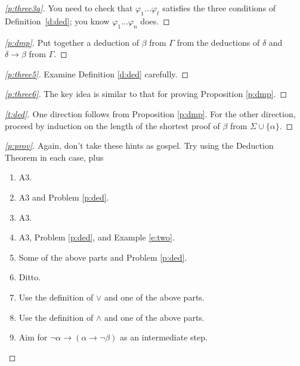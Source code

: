 \documentclass[12pt]{amsbook}
\theoremstyle{plain}
\theoremstyle{definition}
\theoremstyle{remark}
\newenvironment{clue}[1]%
{\begin{proof}[\ref{#1}]}%
{\renewcommand{\qed}{}\end{proof}}
\begin{document}
\begin{clue}{p:three3a}
You need to check that $\varphi_1 \dots \varphi_\ell$ satisfies the three conditions of Definition~\ref{d:ded};  you know $\varphi_1 \dots \varphi_n$ does.
\end{clue}

\begin{clue}{p:dmp}
Put together a deduction of $\beta$ from $\Gamma$ from the deductions of $\delta$ and $\delta \to \beta$ from $\Gamma$.
\end{clue}

\begin{clue}{p:three5}
Examine Definition \ref{d:ded} carefully.
\end{clue}

\begin{clue}{p:three6}
The key idea is similar to that for proving Proposition \ref{p:dmp}.
\end{clue}

\begin{clue}{t:ded}
One direction follows from Proposition \ref{p:dmp}.  For the other direction,  proceed by induction on the length of the shortest proof of $\beta$ from $\Sigma \cup \{ \alpha \}$.
\end{clue}

\begin{clue}{p:prov}
Again,  don't take these hints as gospel.  Try using the Deduction Theorem in each case,  plus
\begin{enumerate}
\item A3.
\item A3 and Problem \ref{p:ded}.
\item A3.
\item A3,  Problem \ref{p:ded},  and Example \ref{e:two}.
\item Some of the above parts and Problem \ref{p:ded}.
\item Ditto.
\item Use the definition of $\lor$ and one of the above parts.
\item Use the definition of $\land$ and one of the above parts.
\item Aim for $\lnot\alpha \to (\alpha \to \lnot\beta)$ as an intermediate step.
\end{enumerate}
\end{clue}



%
%
\end{document}
